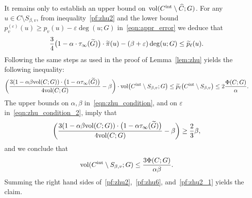 	It remains only to establish an upper bound on~$\mathrm{vol}(C^{\mathrm{int}} \setminus \widehat{C};G)$. For any $u \in C \setminus S_{\beta,v}$, from inequality~\eqref{pf:zhu2} and the lower bound $p_v^{(\varepsilon)}(u) \geq p_v(u)  - \varepsilon \deg(u;G)$ in~\eqref{eqn:appr_error} we deduce that
	\begin{equation}
	\frac{3}{4}\bigl(1 - \alpha \cdot \tau_{\infty}(\widetilde{G})\bigr) \cdot \widetilde{\pi}(u) -  (\beta + \varepsilon)\deg(u;G) \leq \widetilde{p}_{\ell}(u).
	\end{equation}
	Following the same steps as used in the proof of Lemma~\ref{lem:zhu} yields the following inequality:
	\begin{equation*}
	\biggl(\frac{3(1 - \alpha \beta \mathrm{vol}(C;G))\cdot\bigl(1 - \alpha \tau_{\infty}(\widetilde{G})\bigr)}{4\mathrm{vol}(C;G)} - \beta\biggr) \cdot \mathrm{vol}\bigl(C^{\mathrm{int}} \setminus S_{\beta,v}; G\bigr) \leq \widetilde{p}_{\ell}\bigl(C^{\mathrm{int}} \setminus S_{\beta,v}\bigr) \leq 2\frac{\Phi(C;G)}{\alpha}.
	\end{equation*}
	The upper bounds on $\alpha,\beta$ in~\eqref{eqn:zhu_condition},  and on $\varepsilon$ in~\eqref{eqn:zhu_condition_2}, imply that
	\begin{equation*}
	\biggl(\frac{3(1 - \alpha \beta \mathrm{vol}(C;G))\cdot\bigl(1 - \alpha \tau_{\infty}(\widetilde{G})\bigr)}{4\mathrm{vol}(C;G)} - \beta\biggr) \geq \frac{2}{3}\beta,
	\end{equation*}
	and we conclude that
	\begin{equation}
	\label{pf:zhu2_1}
	\mathrm{vol}(C^{\mathrm{int}} \setminus S_{\beta,v}; G) \leq \frac{3\Phi(C;G)}{\alpha\beta}.
	\end{equation}
	Summing the right hand sides of~\eqref{pf:zhu2},~\eqref{pf:zhu6}, and~\eqref{pf:zhu2_1} yields the claim.


